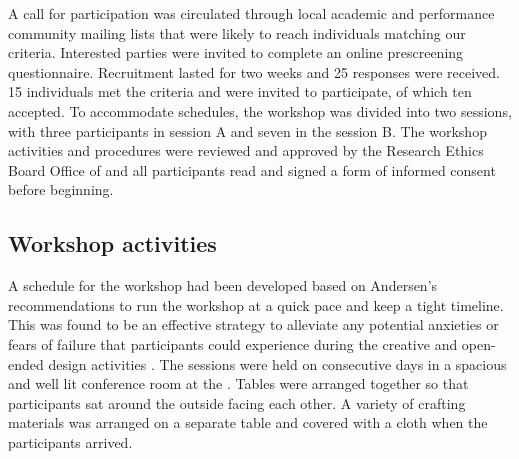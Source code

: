 \documentclass[letterpaper, 12pt]{article}
\begin{document}
A call for participation was circulated through local academic and performance community mailing lists that were likely to reach individuals matching our criteria. 
Interested parties were invited to complete an online prescreening questionnaire. Recruitment lasted for two weeks and 25 responses were received. 15 individuals met the criteria and were invited to participate, of which ten accepted. To accommodate schedules, the workshop was divided into two sessions, with three participants in session A and seven in the session B. 
The workshop activities and procedures were reviewed and approved by the Research Ethics Board Office of  and all participants read and signed a form of informed consent before beginning. 

\subsection{Workshop activities}
\label{ch3-sec:workshop-activities}

A schedule for the workshop had been developed based on Andersen's recommendations to run the workshop at a quick pace and keep a tight timeline. This was found to be an effective strategy to alleviate any potential anxieties or fears of failure that participants could experience during the creative and open-ended design activities \citep{Andersen2017}. The sessions were held on consecutive days in a spacious and well lit conference room at the . Tables were arranged together so that participants sat around the outside facing each other. A variety of crafting materials was  arranged on a separate table and covered with a cloth when the participants arrived. 
\end{document}
